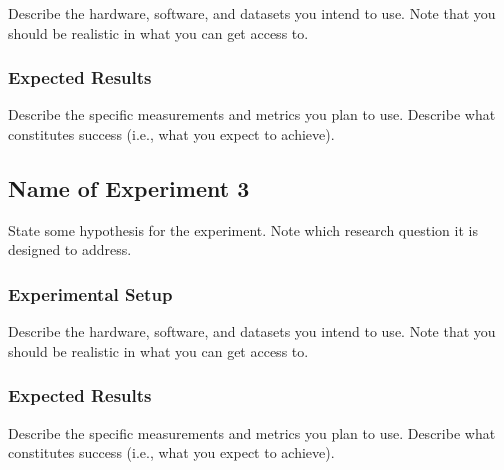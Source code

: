 \documentclass[10pt,twocolumn,pdftex]{article}
\begin{document}
Describe the hardware, software, and datasets you intend to use. Note
that you should be realistic in what you can get access to.

\subsubsection{Expected Results}

Describe the specific measurements and metrics you plan to use. Describe
what constitutes success (i.e., what you expect to achieve).

\subsection{Name of Experiment 3}

State some hypothesis for the experiment. Note which research question
it is designed to address.

\subsubsection{Experimental Setup}

Describe the hardware, software, and datasets you intend to use. Note
that you should be realistic in what you can get access to.

\subsubsection{Expected Results}

Describe the specific measurements and metrics you plan to use. Describe
what constitutes success (i.e., what you expect to achieve).



\end{document}
